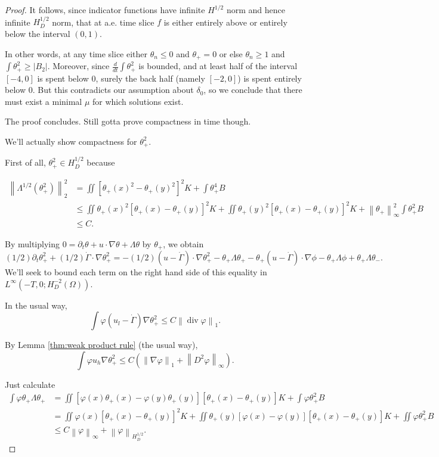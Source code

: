 \documentclass[11pt]{amsart}
\theoremstyle{remark}
\theoremstyle{definition}
\newcommand{\norm}[1]{\left\lVert#1\right\rVert}
\newcommand{\del}{\partial}
\newcommand{\grad}{\nabla}
\newcommand{\ddt}{\frac{d}{dt}}
\renewcommand{\div}{\operatorname{div}}
\newcommand{\ulow}{u_l}
\newcommand{\uhigh}{u_h}
\begin{document}
\begin{proof}
It follows, since indicator functions have infinite $H^{1/2}$ norm and hence infinite $H_D^{1/2}$ norm, that at a.e. time slice $f$ is either entirely above or entirely below the interval $(0,1)$.  

In other words, at any time slice either $\theta_n \leq 0$ and $\theta_+ = 0$ or else $\theta_n \geq 1$ and $\int \theta_+^2 \geq |B_2|$.  Moreover, since $\ddt \int \theta_+^2$ is bounded, and at least half of the interval $[-4,0]$ is spent below 0, surely the back half (namely $[-2,0]$) is spent entirely below 0.  But this contradicts our assumption about $\delta_0$, so we conclude that there must exist a minimal $\mu$ for which solutions exist.  

The proof concludes.  Still gotta prove compactness in time though.  

We'll actually show compactness for $\theta_+^2$.  

First of all, $\theta_+^2 \in H_D^{1/2}$ because

\begin{align*} 
\norm{\Lambda^{1/2}(\theta_+^2)}_2^2 &= \iint [\theta_+(x)^2 - \theta_+(y)^2]^2 K + \int \theta_+^4 B 
\\ &\leq \iint \theta_+(x)^2 [\theta_+(x)-\theta_+(y)]^2 K + \iint \theta_+(y)^2[\theta_+(x)-\theta_+(y)]^2 K + \norm{\theta_+}_\infty^2 \int \theta_+^2 B
\\ &\leq C.
\end{align*}

By multiplying $0 = \del_t \theta + u \cdot \grad \theta + \Lambda \theta$ by $\theta_+$, we obtain
\[ (1/2) \del_t \theta_+^2 + (1/2) \dot{\Gamma} \cdot \grad \theta_+^2 = -(1/2) (u-\dot{\Gamma}) \cdot \grad \theta_+^2 - \theta_+ \Lambda \theta_+ - \theta_+ (u-\dot{\Gamma})\cdot \grad\phi - \theta_+ \Lambda \phi + \theta_+ \Lambda \theta_-. \]
We'll seek to bound each term on the right hand side of this equality in $L^\infty(-T,0; H_D^{-2}(\Omega))$.  

In the usual way,
\[ \int \varphi (\ulow - \dot{\Gamma}) \grad \theta_+^2 \leq C \norm{\div \varphi}_1. \]

By Lemma \ref{thm:weak product rule} (the usual way),
\[ \int \varphi \uhigh \grad \theta_+^2 \leq C (\norm{\grad \varphi}_1 + \norm{D^2 \varphi}_\infty). \]

Just calculate
\begin{align*}
\int \varphi \theta_+ \Lambda \theta_+ &= \iint [\varphi(x)\theta_+(x) - \varphi(y)\theta_+(y)][\theta_+(x)-\theta_+(y)] K + \int \varphi \theta_+^2 B
\\ &= \iint \varphi(x)[\theta_+(x)-\theta_+(y)]^2 K + \iint \theta_+(y) [\varphi(x)-\varphi(y)][\theta_+(x)-\theta_+(y)] K + \iint \varphi \theta_+^2 B
\\ &\leq C \norm{\varphi}_\infty + \norm{\varphi}_{H^{1/2}_D}.
\end{align*}


\end{proof}
\end{document}
